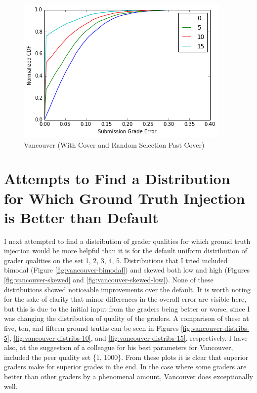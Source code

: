 \documentclass{article}
\begin{document}
	\begin{figure}[h]
		\includegraphics{vancouver-cover-random.png}
		\caption{Vancouver (With Cover and Random Selection Past Cover)}
		\label{fig:vancouver-cover-random}
	\end{figure}
	
	
	\section{Attempts to Find a Distribution for Which Ground Truth Injection is Better than Default}
	I next attempted to find a distribution of grader qualities for which ground truth injection would be more helpful than it is for the default uniform distribution of grader qualities on the set {1, 2, 3, 4, 5}. Distributions that I tried included bimodal (Figure \ref{fig:vancouver-bimodal}) and skewed both low and high (Figures \ref{fig:vancouver-skewed} and \ref{fig:vancouver-skewed-low}). None of these distributions showed noticeable improvements over the default. It is worth noting for the sake of clarity that minor differences in the overall error are visible here, but this is due to the initial input from the graders being better or worse, since I was changing the distribution of quality of the graders. A comparison of these at five, ten, and fifteen ground truths can be seen in Figures \ref{fig:vancouver-distribs-5}, \ref{fig:vancouver-distribs-10}, and \ref{fig:vancouver-distribs-15}, respectively. I have also, at the suggestion of a colleague for his best parameters for Vancouver, included the peer quality set \{1, 1000\}. From these plots it is clear that superior graders make for superior grades in the end. In the case where some graders are better than other graders by a phenomenal amount, Vancouver does exceptionally well.
	
\end{document}
